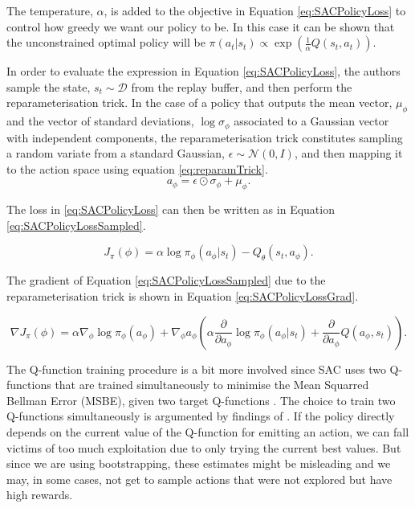 \documentclass{report}
\numberwithin{equation}{section}
\numberwithin{figure}{section}
\numberwithin{table}{section}
\numberwithin{algorithm}{section}
\begin{document}
The temperature, $\alpha$, is added to the objective in Equation
\ref{eq:SACPolicyLoss} to control how greedy we want our policy 
to be. In this case it can be shown that the unconstrained 
optimal policy 
will be $\pi(a_t|s_t)\propto\exp\left(\frac{1}{\alpha}Q(s_t,a_t)\right)$.

In order to evaluate the expression in Equation \ref{eq:SACPolicyLoss}, 
the authors sample the state, $s_t\sim\mathcal{D}$ from the 
replay buffer, and then perform the reparameterisation trick. 
In the case of a policy that outputs the mean vector, $\mu_\phi$ and 
the vector of standard deviations, $\log\sigma_\phi$ 
associated to a Gaussian vector 
with independent components, the reparameterisation trick constitutes 
sampling a random variate from a standard Gaussian, 
$\epsilon\sim\mathcal{N}(0, I)$, and then mapping it to the action space 
using equation \ref{eq:reparamTrick}.
\begin{equation}\label{eq:reparamTrick}
  a_\phi=\epsilon \odot \sigma_\phi + \mu_\phi.
\end{equation}

The loss in \ref{eq:SACPolicyLoss} can then be written as in 
Equation \ref{eq:SACPolicyLossSampled}.

\begin{equation}\label{eq:SACPolicyLossSampled}
  J_\pi(\phi)=\alpha \log \pi_\phi(a_\phi|s_t) - Q_\theta(s_t, a_\phi).
\end{equation}

The gradient of Equation \ref{eq:SACPolicyLossSampled} 
due to the reparameterisation trick is shown in Equation 
\ref{eq:SACPolicyLossGrad}.

\begin{equation}\label{eq:SACPolicyLossGrad}
  \nabla J_\pi(\phi)=\alpha \nabla_\phi \log\pi_\phi(a_\phi)
  + \nabla_\phi a_\phi\left(\alpha\frac{\partial}{\partial a_\phi}
  \log \pi_\phi(a_\phi|s_t)
  + \frac{\partial}{\partial a_\phi}Q(a_\phi, s_t)\right).
\end{equation}



The Q-function training procedure is a bit more involved 
since SAC uses two Q-functions \citep{HasseltDoubleQlearning} 
that are trained simultaneously to 
minimise the Mean Squarred Bellman Error (MSBE), given two 
target Q-functions \citep{DQN}. The choice to train 
two Q-functions simultaneously 
is argumented by findings of \cite{HasseltDoubleQlearning}. 
If the policy directly depends on the current 
value of the Q-function for emitting an action, we can fall 
victims of too much exploitation due to only trying the current 
best values. But since we are using bootstrapping, these 
estimates might be misleading and we may, in some cases, not 
get to sample actions that were not explored but have 
high rewards.
\end{document}
